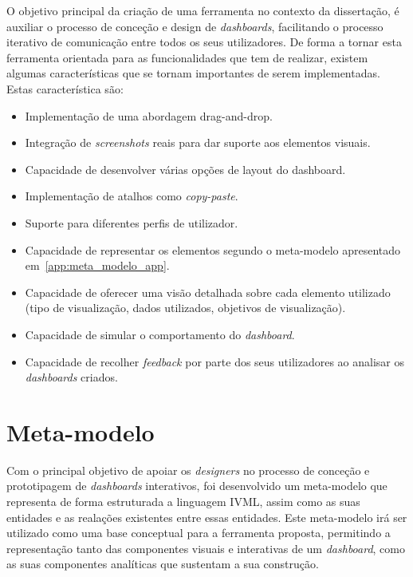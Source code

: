 O objetivo principal da criação de uma ferramenta no contexto da dissertação, é auxiliar o processo de conceção e design de \textit{dashboards}, facilitando o processo iterativo de comunicação entre todos os seus utilizadores. De forma a tornar esta ferramenta orientada para as funcionalidades que tem de realizar, existem algumas características que se tornam importantes de serem implementadas. Estas característica são:

\begin{itemize}
  \item Implementação de uma abordagem drag-and-drop.
  \item Integração de \textit{screenshots} reais para dar suporte aos elementos visuais.
  \item Capacidade de desenvolver várias opções de layout do dashboard.
  \item Implementação de atalhos como \textit{copy-paste}.
  \item Suporte para diferentes perfis de utilizador.
  \item Capacidade de representar os elementos segundo o meta-modelo apresentado em~\ref{app:meta_modelo_app}.
  \item Capacidade de oferecer uma visão detalhada sobre cada elemento utilizado (tipo de visualização, dados utilizados, objetivos de visualização).
  \item Capacidade de simular o comportamento do \textit{dashboard}.
  \item Capacidade de recolher \textit{feedback} por parte dos seus utilizadores ao analisar os \textit{dashboards} criados.
\end{itemize}

\section{Meta-modelo} %
\label{sec:meta_modelo}

Com o principal objetivo de apoiar os \textit{designers} no processo de conceção e prototipagem de \textit{dashboards} interativos, foi desenvolvido um meta-modelo que representa de forma estruturada a linguagem IVML, assim como as suas entidades e as realações existentes entre essas entidades. Este meta-modelo irá ser utilizado como uma base conceptual para a ferramenta proposta, permitindo a representação tanto das componentes visuais e interativas de um \textit{dashboard}, como as suas componentes analíticas que sustentam a sua construção.

